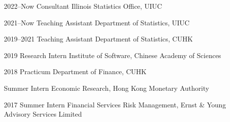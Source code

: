 

\begin{cvskills}

  \cvskill
    {2022--Now} %
    {Consultant} %
    {Illinois Statistics Office, UIUC} %

  \cvskill
    {2021--Now} %
    {Teaching Assistant} %
    {Department of Statistics, UIUC} %

  \cvskill
    {2019--2021} %
    {Teaching Assistant} %
    {Department of Statistics, CUHK} %

  \cvskill
    {2019} %
    {Research Intern} %
    {Institute of Software, Chinese Academy of Sciences} %

  \cvskill
    {2018} %
    {Practicum} %
    {Department of Finance, CUHK} %

  \cvskill
    {} %
    {Summer Intern} %
    {Economic Research, Hong Kong Monetary Authority} %

  \cvskill
    {2017} %
    {Summer Intern} %
    {Financial Services Risk Management, Ernst \& Young Advisory Services Limited} %

\end{cvskills}
